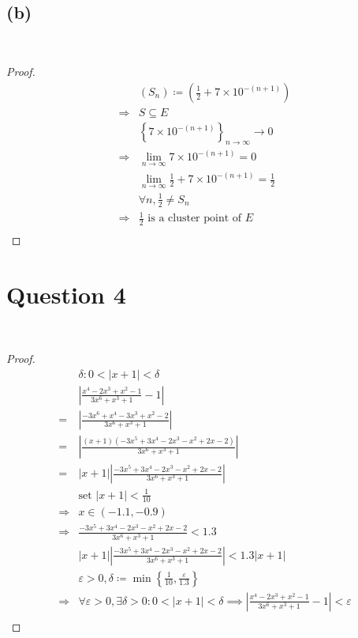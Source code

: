 \documentclass{article}
\begin{document}
~

\subsection*{(b)}

~

\begin{proof}
    \begin{align*}
        &(S_n)\coloneqq\left(\frac{1}{2}+7\times10^{-(n+1)}\right)\\
        \Rightarrow&S\subseteq E\\
        &\left\{7\times10^{-(n+1)}\right\}_{n\to\infty}\to0\\
        \Rightarrow&\lim_{n\to\infty}7\times10^{-(n+1)}=0\\
        &\lim_{n\to\infty}\frac{1}{2}+7\times10^{-(n+1)}=\frac{1}{2}\\
        &\forall n,\frac{1}{2}\ne S_n\\
        \Rightarrow&\frac{1}{2}\text{ is a cluster point of }E\\
    \end{align*}
\end{proof}

\newpage

\section*{Question 4}

~

\begin{proof}
    \begin{align*}
        &\delta:0<|x+1|<\delta \\
        &\left|\frac{x^4-2x^3+x^2-1}{3x^6+x^3+1}-1\right|\\
        =&\left|\frac{-3x^6+x^4-3x^3+x^2-2}{3x^6+x^3+1}\right|\\
        =&\left|\frac{(x+1)(-3x^5+3x^4-2x^3-x^2+2x-2)}{3x^6+x^3+1}\right|\\
        =&\left|x+1\right|\left|\frac{-3x^5+3x^4-2x^3-x^2+2x-2}{3x^6+x^3+1}\right|\\
        &\text{set }|x+1|<\frac{1}{10}\\
        \Rightarrow&x\in(-1.1,-0.9)\\
        \Rightarrow&\frac{-3x^5+3x^4-2x^3-x^2+2x-2}{3x^6+x^3+1}<1.3\\
        &\left|x+1\right|\left|\frac{-3x^5+3x^4-2x^3-x^2+2x-2}{3x^6+x^3+1}\right|<1.3|x+1|\\
        &\varepsilon>0,\delta\coloneqq \min\left\{\frac{1}{10},\frac{\varepsilon}{1.3}\right\}\\
        \Rightarrow&\forall \varepsilon>0,\exists \delta>0:0<|x+1|<\delta\implies \left|\frac{x^4-2x^3+x^2-1}{3x^6+x^3+1}-1\right|<\varepsilon\\
    \end{align*}
\end{proof}
\end{document}
